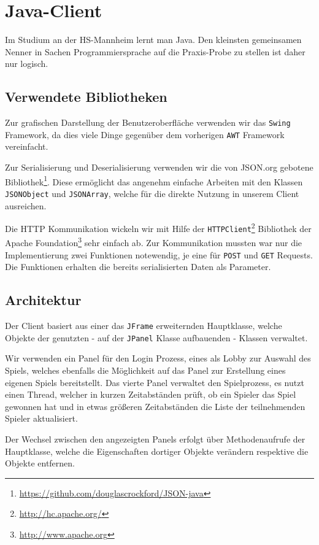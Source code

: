 \documentclass[12pt, a4paper]{scrartcl}
\begin{document}
\clearpage
\section{Java-Client}

Im Studium an der HS-Mannheim lernt man Java. Den kleinsten gemeinsamen Nenner
in Sachen Programmiersprache auf die Praxis-Probe zu stellen ist daher nur
logisch.
\np

\subsection{Verwendete Bibliotheken}
Zur grafischen Darstellung der Benutzeroberfläche verwenden wir das
\texttt{Swing} Framework, da dies viele Dinge gegenüber dem vorherigen 
\texttt{AWT} Framework vereinfacht.
\np

Zur Serialisierung und Deserialisierung verwenden wir die von JSON.org gebotene
Bibliothek\footnote{\url{https://github.com/douglascrockford/JSON-java}}. Diese
ermöglicht das angenehm einfache Arbeiten mit den Klassen \texttt{JSONObject}
und \texttt{JSONArray}, welche für die direkte Nutzung in unserem Client ausreichen.
\np

Die HTTP Kommunikation wickeln wir mit Hilfe der \texttt{HTTPClient}\footnote{
\url{http://hc.apache.org/}} Bibliothek der Apache Foundation\footnote{
\url{http://www.apache.org}} sehr einfach ab. Zur Kommunikation mussten war nur
die Implementierung zwei Funktionen notewendig, je eine für \texttt{POST} und
\texttt{GET} Requests. Die Funktionen erhalten die bereits serialisierten Daten
als Parameter.
\np

\subsection{Architektur}
Der Client basiert aus einer das \texttt{JFrame} erweiternden Hauptklasse,
welche Objekte der genutzten - auf der \texttt{JPanel} Klasse aufbauenden
- Klassen verwaltet.
\np

Wir verwenden ein Panel für den Login Prozess, eines als Lobby zur Auswahl
des Spiels, welches ebenfalls die Möglichkeit auf das Panel zur Erstellung
eines eigenen Spiels bereitstellt. Das vierte Panel verwaltet den Spielprozess,
es nutzt einen Thread, welcher in kurzen Zeitabständen prüft, ob ein Spieler
das Spiel gewonnen hat und in etwas größeren Zeitabständen die Liste der
teilnehmenden Spieler aktualisiert.
\np

Der Wechsel zwischen den angezeigten Panels erfolgt über Methodenaufrufe der
Hauptklasse, welche die Eigenschaften dortiger Objekte verändern respektive
die Objekte entfernen.
\end{document}
